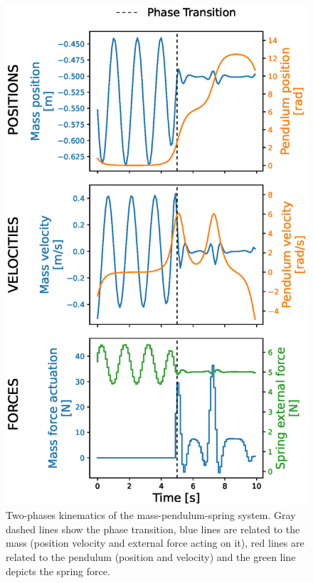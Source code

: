 \begin{figure}[h!]
\centering
\includegraphics[width=\columnwidth]{figures/Mass_Pendulum_Fext.eps}
\caption{Two-phases kinematics of the mass-pendulum-spring system. Gray dashed lines show the phase transition, blue lines are related to the mass (position velocity and external force acting on it), red lines are related to the pendulum (position and velocity) and the green line depicts the spring force.}
\label{fig:Mass_Pendulum_Fext_graphs}
\end{figure}


